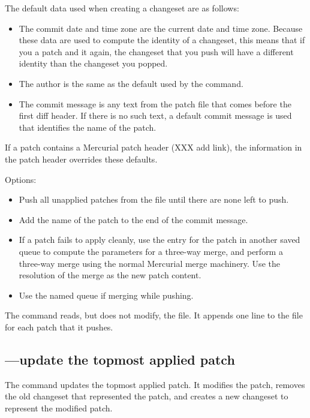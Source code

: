 The default data used when creating a changeset are as follows:
\begin{itemize}
\item The commit date and time zone are the current date and time
  zone.  Because these data are used to compute the identity of a
  changeset, this means that if you  a patch and
   it again, the changeset that you push will have a
  different identity than the changeset you popped.
\item The author is the same as the default used by the 
  command.
\item The commit message is any text from the patch file that comes
  before the first diff header.  If there is no such text, a default
  commit message is used that identifies the name of the patch.
\end{itemize}
If a patch contains a Mercurial patch header (XXX add link), the
information in the patch header overrides these defaults.

Options:
\begin{itemize}
\item[\hgxopt{mq}{qpush}{-a}] Push all unapplied patches from the
   file until there are none left to push.
\item[\hgxopt{mq}{qpush}{-l}] Add the name of the patch to the end
  of the commit message.
\item[\hgxopt{mq}{qpush}{-m}] If a patch fails to apply cleanly, use the
  entry for the patch in another saved queue to compute the parameters
  for a three-way merge, and perform a three-way merge using the
  normal Mercurial merge machinery.  Use the resolution of the merge
  as the new patch content.
\item[\hgxopt{mq}{qpush}{-n}] Use the named queue if merging while pushing.
\end{itemize}

The  command reads, but does not modify, the
 file.  It appends one line to the 
file for each patch that it pushes.

\subsection{---update the topmost applied patch}

The  command updates the topmost applied patch.  It
modifies the patch, removes the old changeset that represented the
patch, and creates a new changeset to represent the modified patch.

